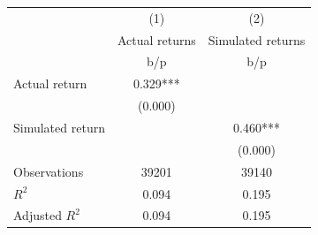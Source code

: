 {
\def\sym#1{\ifmmode^{#1}\else\(^{#1}\)\fi}
\begin{tabular}{l*{2}{c}}
\hline\hline
                    &\multicolumn{1}{c}{(1)}&\multicolumn{1}{c}{(2)}\\
                    &\multicolumn{1}{c}{Actual returns}&\multicolumn{1}{c}{Simulated returns}\\
                    &         b/p   &         b/p   \\
\hline
Actual return       &       0.329***&               \\
                    &     (0.000)   &               \\
Simulated return    &               &       0.460***\\
                    &               &     (0.000)   \\
\hline
Observations        &       39201   &       39140   \\
\(R^{2}\)           &       0.094   &       0.195   \\
Adjusted \(R^{2}\)  &       0.094   &       0.195   \\
\hline\hline
\end{tabular}
}
